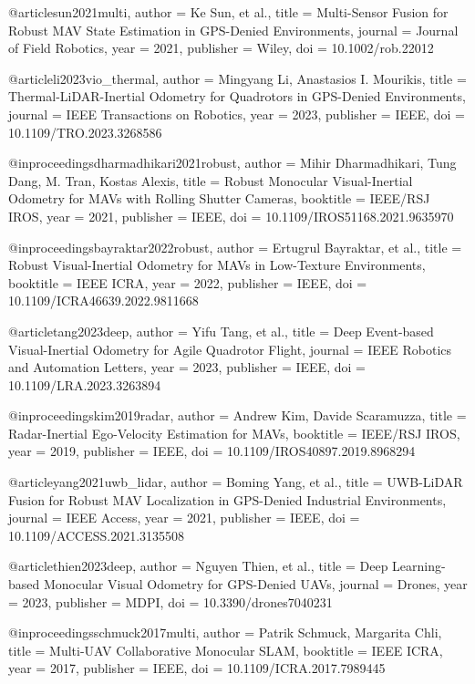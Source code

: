 @article{sun2021multi,
  author = {Ke Sun, et al.},
  title = {Multi-Sensor Fusion for Robust MAV State Estimation in GPS-Denied Environments},
  journal = {Journal of Field Robotics},
  year = {2021},
  publisher = {Wiley},
  doi = {10.1002/rob.22012}
}

@article{li2023vio_thermal,
  author = {Mingyang Li, Anastasios I. Mourikis},
  title = {Thermal-LiDAR-Inertial Odometry for Quadrotors in GPS-Denied Environments},
  journal = {IEEE Transactions on Robotics},
  year = {2023},
  publisher = {IEEE},
  doi = {10.1109/TRO.2023.3268586}
}

@inproceedings{dharmadhikari2021robust,
  author = {Mihir Dharmadhikari, Tung Dang, M. Tran, Kostas Alexis},
  title = {Robust Monocular Visual-Inertial Odometry for MAVs with Rolling Shutter Cameras},
  booktitle = {IEEE/RSJ IROS},
  year = {2021},
  publisher = {IEEE},
  doi = {10.1109/IROS51168.2021.9635970}
}

@inproceedings{bayraktar2022robust,
  author = {Ertugrul Bayraktar, et al.},
  title = {Robust Visual-Inertial Odometry for MAVs in Low-Texture Environments},
  booktitle = {IEEE ICRA},
  year = {2022},
  publisher = {IEEE},
  doi = {10.1109/ICRA46639.2022.9811668}
}

@article{tang2023deep,
  author = {Yifu Tang, et al.},
  title = {Deep Event-based Visual-Inertial Odometry for Agile Quadrotor Flight},
  journal = {IEEE Robotics and Automation Letters},
  year = {2023},
  publisher = {IEEE},
  doi = {10.1109/LRA.2023.3263894}
}

@inproceedings{kim2019radar,
  author = {Andrew Kim, Davide Scaramuzza},
  title = {Radar-Inertial Ego-Velocity Estimation for MAVs},
  booktitle = {IEEE/RSJ IROS},
  year = {2019},
  publisher = {IEEE},
  doi = {10.1109/IROS40897.2019.8968294}
}

@article{yang2021uwb_lidar,
  author = {Boming Yang, et al.},
  title = {UWB-LiDAR Fusion for Robust MAV Localization in GPS-Denied Industrial Environments},
  journal = {IEEE Access},
  year = {2021},
  publisher = {IEEE},
  doi = {10.1109/ACCESS.2021.3135508}
}

@article{thien2023deep,
  author = {Nguyen Thien, et al.},
  title = {Deep Learning-based Monocular Visual Odometry for GPS-Denied UAVs},
  journal = {Drones},
  year = {2023},
  publisher = {MDPI},
  doi = {10.3390/drones7040231}
}

@inproceedings{schmuck2017multi,
  author = {Patrik Schmuck, Margarita Chli},
  title = {Multi-UAV Collaborative Monocular SLAM},
  booktitle = {IEEE ICRA},
  year = {2017},
  publisher = {IEEE},
  doi = {10.1109/ICRA.2017.7989445}
}

